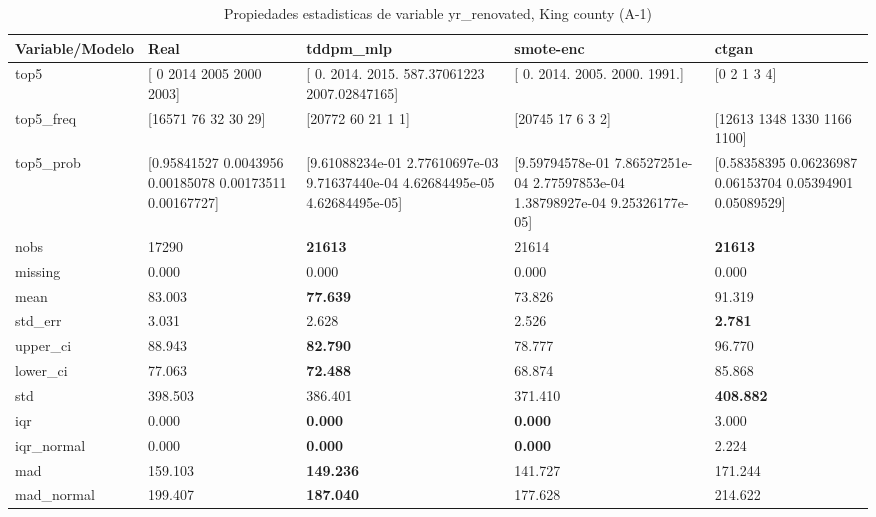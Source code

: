 \begin{table}[H]
\centering
\fontsize{8}{14}\selectfont
\caption{Propiedades  estadisticas de variable yr\_renovated, King county (A-1)}
\label{table-stats-king county-a-1-yr_renovated}
\begin{tabular}{|l|m{10em}|m{10em}|m{10em}|m{10em}|}
\hline
 \rowcolor[gray]{0.8}
Variable/Modelo & Real & tddpm\_mlp & smote-enc & ctgan \\
\hline top5 & [   0 2014 2005 2000 2003] & [   0.         2014.         2015.          587.37061223 2007.02847165] & [   0. 2014. 2005. 2000. 1991.] & [0 2 1 3 4] \\
\hline top5\_freq & [16571    76    32    30    29] & [20772    60    21     1     1] & [20745    17     6     3     2] & [12613  1348  1330  1166  1100] \\
\hline top5\_prob & [0.95841527 0.0043956  0.00185078 0.00173511 0.00167727] & [9.61088234e-01 2.77610697e-03 9.71637440e-04 4.62684495e-05
 4.62684495e-05] & [9.59794578e-01 7.86527251e-04 2.77597853e-04 1.38798927e-04
 9.25326177e-05] & [0.58358395 0.06236987 0.06153704 0.05394901 0.05089529] \\
\hline nobs & 17290 & \bfseries 21613 & \cellcolor[rgb]{0.9, 0.54, 0.52} 21614 & \bfseries 21613 \\
\hline missing & 0.000 & 0.000 & 0.000 & 0.000 \\
\hline mean & 83.003 & \bfseries 77.639 & \cellcolor[rgb]{0.9, 0.54, 0.52} 73.826 & 91.319 \\
\hline std\_err & 3.031 & 2.628 & \cellcolor[rgb]{0.9, 0.54, 0.52} 2.526 & \bfseries 2.781 \\
\hline upper\_ci & 88.943 & \bfseries 82.790 & \cellcolor[rgb]{0.9, 0.54, 0.52} 78.777 & 96.770 \\
\hline lower\_ci & 77.063 & \bfseries 72.488 & 68.874 & \cellcolor[rgb]{0.9, 0.54, 0.52} 85.868 \\
\hline std & 398.503 & 386.401 & \cellcolor[rgb]{0.9, 0.54, 0.52} 371.410 & \bfseries 408.882 \\
\hline iqr & 0.000 & \bfseries 0.000 & \bfseries 0.000 & \cellcolor[rgb]{0.9, 0.54, 0.52} 3.000 \\
\hline iqr\_normal & 0.000 & \bfseries 0.000 & \bfseries 0.000 & \cellcolor[rgb]{0.9, 0.54, 0.52} 2.224 \\
\hline mad & 159.103 & \bfseries 149.236 & \cellcolor[rgb]{0.9, 0.54, 0.52} 141.727 & 171.244 \\
\hline mad\_normal & 199.407 & \bfseries 187.040 & \cellcolor[rgb]{0.9, 0.54, 0.52} 177.628 & 214.622 \\

\end{tabular}
\end{table}
